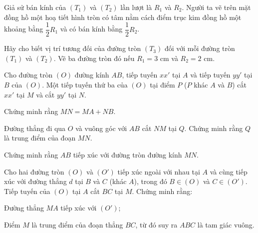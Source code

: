 \begin{exercises}
\begin{questions}[resume=SGK]
\begin{questions}
            \item Giả sử bán kính của $(T_1)$ và $(T_2)$ lần lượt là $R_1$ và $R_2$. Người ta vẽ trên mặt đồng hồ một hoạ tiết hình tròn có tâm nằm cách điểm trục kim đồng hồ một khoảng bằng $\dfrac{1}{2}R_1$ và có bán kính bằng $\dfrac{1}{2}R_2$.

            Hãy cho biết vị trí tương đối của đường tròn $(T_3)$ đối với mỗi đường tròn $(T_1)$ và $(T_2)$. Vẽ ba đường tròn đó nếu $R_1=3$ cm và $R_2=2$ cm.

            \answerline
            \answerline
            \answerline
        \end{questions}

        \item Cho đường tròn $(O)$ đường kính $AB$, tiếp tuyến $xx'$ tại $A$ và tiếp tuyến $yy'$ tại $B$ của $(O)$. Một tiếp tuyến thứ ba của $(O)$ tại điểm $P$ ($P$ khác $A$ và $B$) cắt $xx'$ tại $M$ và cắt $yy'$ tại $N$.
        \begin{questions}
            \item Chứng minh rằng $MN=MA+NB$.

            \answerline
            \answerline
            \answerline

            \item Đường thẳng đi qua $O$ và vuông góc với $AB$ cắt $NM$ tại $Q$. Chứng minh rằng $Q$ là trung điểm của đoạn $MN$.

            \answerline
            \answerline
            \answerline

            \item Chứng minh rằng $AB$ tiếp xúc với đường tròn đường kính $MN$.

            \answerline
            \answerline
            \answerline
        \end{questions}

        \item Cho hai đường tròn $(O)$ và $(O')$ tiếp xúc ngoài với nhau tại $A$ và cùng tiếp xúc với đường thẳng $d$ tại $B$ và $C$ (khác $A$), trong đó $B\in (O)$ và $C\in (O')$. Tiếp tuyến của $(O)$ tại $A$ cắt $BC$ tại $M$. Chứng minh rằng:
        \begin{questions}
            \item Đường thẳng $MA$ tiếp xúc với $(O')$;

            \answerline
            \answerline
            \answerline

            \item Điểm $M$ là trung điểm của đoạn thẳng $BC$, từ đó suy ra $ABC$ là tam giác vuông.


\end{questions}
\end{questions}
\end{exercises}
